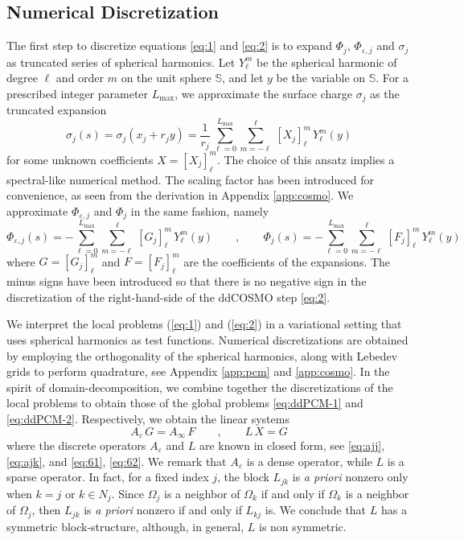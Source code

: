 \subsection{Numerical Discretization}

The first step to discretize equations \eqref{eq:1} and \eqref{eq:2} is to expand $\Phi_j$, $\Phi_{\varepsilon,j}$ and $\sigma_j$ as truncated series of spherical harmonics. Let $Y_\ell^m$ be the spherical harmonic of degree $\ell$ and order $m$ on the unit sphere $\mathbb{S}$, and let $y$ be the variable on $\mathbb{S}$. For a prescribed integer parameter ${L_\text{max}}$,  we approximate the surface charge $\sigma_j$ as the truncated expansion
\[
\sigma_j(s) = \sigma_j(x_j + r_j y) = \frac{1}{r_j} \, \sum_{\ell=0}^{L_\text{max}} \sum_{m = -\ell}^\ell \, [X_j]_\ell^m \, Y_\ell^m(y)
\]
for some unknown coefficients $X = [X_j]_\ell^m$. The choice of this ansatz implies a spectral-like numerical method. The scaling factor has been introduced for convenience, as seen from the derivation in Appendix \ref{app:cosmo}. We approximate $\Phi_{\varepsilon,j}$ and $\Phi_j$ in the same fashion, namely
\begin{equation}\label{eq:71}
\Phi_{\varepsilon,j}(s) = - \sum_{\ell=0}^{L_\text{max}} \sum_{m = -\ell}^\ell \, [G_j]_\ell^m \, Y_\ell^m(y) \qquad , \qquad \Phi_j(s) = -\sum_{\ell=0}^{L_\text{max}} \sum_{m = -\ell}^\ell \, [F_j]_\ell^m \, Y_\ell^m(y)
\end{equation}
where $G = [G_j]_\ell^m$ and $F = [F_j]_\ell^m$ are the coefficients of the expansions. The minus signs have been introduced so that there is no negative sign in the discretization of the right-hand-side of the ddCOSMO step \eqref{eq:2}. 


We interpret the local problems (\ref{eq:1}) and (\ref{eq:2}) in a variational setting that uses spherical harmonics as test functions. Numerical discretizations are obtained by employing the orthogonality of the spherical harmonics, along with Lebedev grids to perform quadrature, see Appendix \ref{app:pcm} and \ref{app:cosmo}. In the spirit of domain-decomposition, we combine together the discretizations of the local problems to obtain those of the global problems \eqref{eq:ddPCM-1} and \eqref{eq:ddPCM-2}. Respectively, we obtain the linear systems
\begin{equation}\label{eq:6}
A_\varepsilon \, G = A_\infty \, F \qquad , \qquad  L \, X = G
\end{equation}
where the discrete operators $A_\varepsilon$ and $L$ are known in closed form, see \eqref{eq:ajj}, \eqref{eq:ajk}, and \eqref{eq:61}, \eqref{eq:62}. We remark that $A_\varepsilon$ is a dense operator, while $L$ is a sparse operator. In fact, for a fixed index $j$, the block $L_{jk}$ is \emph{a priori} nonzero only when $k = j$ or $k \in N_j$. Since $\Omega_j$ is a neighbor of $\Omega_k$ if and only if $\Omega_k$ is a neighbor of $\Omega_j$, then $L_{jk}$ is \emph{a priori} nonzero if and only if $L_{kj}$ is. We conclude that $L$ has a symmetric block-structure, although, in general, $L$ is non symmetric.

